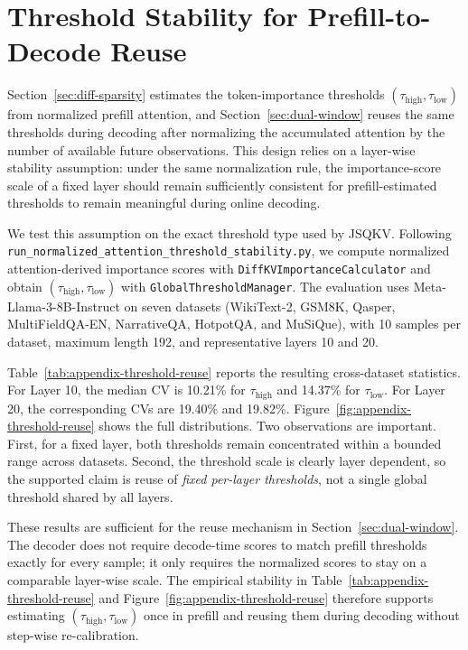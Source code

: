 
\providecommand{\method}{JSQKV}
\providecommand{\attnscorefigdir}{AttnScoreThreshold/normalized_attention_threshold_llama3_8b/paper_main}

\section{Threshold Stability for Prefill-to-Decode Reuse}
\label{sec:appendix-threshold-reuse}

Section~\ref{sec:diff-sparsity} estimates the token-importance thresholds
$(\tau_{\text{high}}, \tau_{\text{low}})$ from normalized prefill attention,
and Section~\ref{sec:dual-window} reuses the same thresholds during decoding
after normalizing the accumulated attention by the number of available future
observations. This design relies on a layer-wise stability assumption: under
the same normalization rule, the importance-score scale of a fixed layer should
remain sufficiently consistent for prefill-estimated thresholds to remain
meaningful during online decoding.

We test this assumption on the exact threshold type used by \method. Following
\texttt{run\_normalized\_attention\_threshold\_stability.py}, we compute
normalized attention-derived importance scores with
\texttt{DiffKVImportanceCalculator} and obtain
$(\tau_{\text{high}}, \tau_{\text{low}})$ with
\texttt{GlobalThresholdManager}. The evaluation uses
Meta-Llama-3-8B-Instruct on seven datasets (WikiText-2, GSM8K, Qasper,
MultiFieldQA-EN, NarrativeQA, HotpotQA, and MuSiQue), with 10 samples per
dataset, maximum length 192, and representative layers 10 and 20.

Table~\ref{tab:appendix-threshold-reuse} reports the resulting cross-dataset
statistics. For Layer 10, the median CV is 10.21\% for
$\tau_{\text{high}}$ and 14.37\% for $\tau_{\text{low}}$. For Layer 20, the
corresponding CVs are 19.40\% and 19.82\%. Figure~\ref{fig:appendix-threshold-reuse}
shows the full distributions. Two observations are important. First, for a
fixed layer, both thresholds remain concentrated within a bounded range across
datasets. Second, the threshold scale is clearly layer dependent, so the
supported claim is reuse of \emph{fixed per-layer thresholds}, not a single
global threshold shared by all layers.

These results are sufficient for the reuse mechanism in
Section~\ref{sec:dual-window}. The decoder does not require decode-time scores
to match prefill thresholds exactly for every sample; it only requires the
normalized scores to stay on a comparable layer-wise scale. The empirical
stability in Table~\ref{tab:appendix-threshold-reuse} and
Figure~\ref{fig:appendix-threshold-reuse} therefore supports estimating
$(\tau_{\text{high}}, \tau_{\text{low}})$ once in prefill and reusing them
during decoding without step-wise re-calibration.

